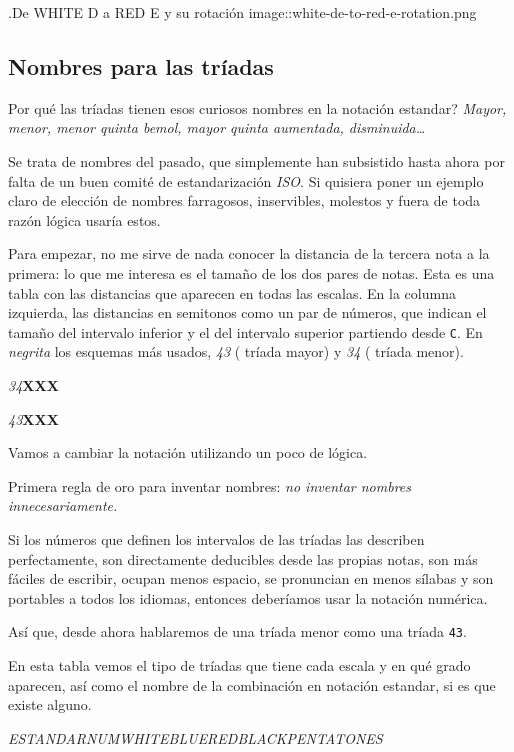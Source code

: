 \documentclass[]{article}
\begin{document}
.De WHITE D a RED E y su rotación image::white-de-to-red-e-rotation.png

\subsection{Nombres para las tríadas}

Por qué las tríadas tienen esos curiosos nombres en la notación estandar? \emph{Mayor, menor, menor quinta bemol, mayor quinta   aumentada, disminuida\ldots{}}

Se trata de nombres del pasado, que simplemente han subsistido hasta ahora por falta de un buen comité de estandarización \emph{ISO}. Si quisiera poner un ejemplo claro de elección de nombres farragosos, inservibles, molestos y fuera de toda razón lógica usaría estos.

Para empezar, no me sirve de nada conocer la distancia de la tercera nota a la primera: lo que me interesa es el tamaño de los dos pares de notas. Esta es una tabla con las distancias que aparecen en todas las escalas. En la columna izquierda, las distancias en semitonos como un par de números, que indican el tamaño del intervalo inferior y el del intervalo superior partiendo desde \texttt{C}. En \emph{negrita} los esquemas más usados, \emph{43} ( tríada mayor) y \emph{34} ( tríada menor).

\emph{34}\textbf{X}\textbf{X}\textbf{X}

\emph{43}\textbf{X}\textbf{X}\textbf{X}

Vamos a cambiar la notación utilizando un poco de lógica.

Primera regla de oro para inventar nombres: \emph{no inventar nombres   innecesariamente.}

Si los números que definen los intervalos de las tríadas las describen perfectamente, son directamente deducibles desde las propias notas, son más fáciles de escribir, ocupan menos espacio, se pronuncian en menos sílabas y son portables a todos los idiomas, entonces deberíamos usar la notación numérica.

Así que, desde ahora hablaremos de una tríada menor como una tríada \texttt{43}.

En esta tabla vemos el tipo de tríadas que tiene cada escala y en qué grado aparecen, así como el nombre de la combinación en notación estandar, si es que existe alguno.

\emph{ESTANDAR}\emph{NUM}\emph{WHITE}\emph{BLUE}\emph{RED}\emph{BLACK}\emph{PENTA}\emph{TONES}
\end{document}

